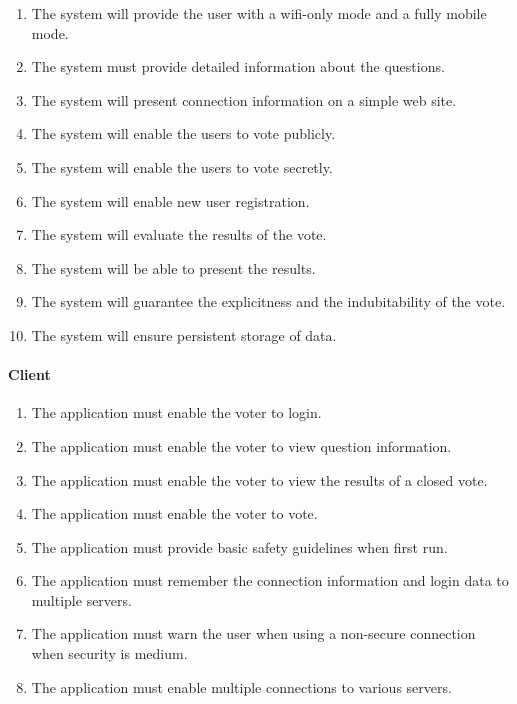 \documentclass[11pt,twoside,a4paper]{book}
\begin{document}
\begin{enumerate}

\item  The system will provide the user with a wifi-only mode and a fully mobile mode.
\item  The system must provide detailed information about the questions.
\item  The system will present connection information on a simple web site.
\item  The system will enable the users to vote publicly. \cite{bakalarkaJV}
\item  The system will enable the users to vote secretly. \cite{bakalarkaJV}
\item  The system will enable new user registration. \cite{bakalarkaJV}
\item The system will evaluate the results of the vote.\cite{bakalarkaJV}
\item The system will be able to present the results.\cite{bakalarkaJV}
\item The system will guarantee the explicitness and the indubitability of the vote. \cite{bakalarkaJV}
\item The system will ensure persistent storage of data. \cite{bakalarkaJV}
\end{enumerate}
\paragraph*{Client}
\begin{enumerate}
\item The application must enable the voter to login. 
\item The application must enable the voter to view question information.
\item The application must enable the voter to view the results of a closed vote. 
\item The application must enable the voter to vote.
\item The application must provide basic safety guidelines when first run.
\item The application must remember the connection information and login data to multiple servers.
\item The application must warn the user when using a non-secure connection when security is medium.
\item The application must enable multiple connections to various servers.
\end{enumerate}
\end{document}
